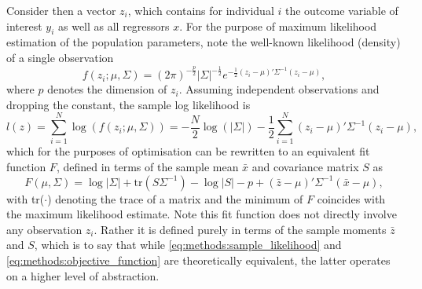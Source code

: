 Consider then a vector $z_i$, which contains for individual $i$ the outcome variable of interest $y_i$ as well as
all regressors $x$.
For the purpose of maximum likelihood estimation of the population parameters, note the well-known
likelihood (density) of a single observation
\begin{equation}
    f(z_i; \mu, \Sigma) = (2\pi)^{-\frac{p}{2}} |\Sigma|^{-\frac{1}{2}} e^{-\frac{1}{2}(z_i - \mu)' \Sigma^{-1}(z_i - \mu)},
\end{equation}
where $p$ denotes the dimension of $z_i$.
Assuming independent observations and dropping the constant, the sample log likelihood is
\begin{equation}
    \label{eq:methods:sample_likelihood}
    l(z) = \sum_{i=1}^N \log(f(z_i; \mu, \Sigma))
    = -\frac{N}{2} \log(|\Sigma|) -\frac{1}{2} \sum_{i=1}^N (z_i - \mu)' \Sigma^{-1} (z_i - \mu),
\end{equation}
which for the purposes of optimisation can be rewritten to an equivalent fit function $F$, defined in terms of
the sample mean $\bar{x}$ and covariance matrix $S$ \cite{preacher2016ml} as
\begin{equation}
    \label{eq:methods:objective_function}
    F(\mu, \Sigma) = \log|\Sigma| + \text{tr}(S \Sigma^{-1}) - \log|S| - p + (\bar{z} - \mu)' \Sigma^{-1} (\bar{x} - \mu),
\end{equation}
with tr($\cdot$) denoting the trace of a matrix and the minimum of $F$ coincides with the maximum likelihood estimate.
Note this fit function does not directly involve any observation $z_i$. Rather it is defined purely in terms of the
sample moments $\bar{z}$ and $S$, which is to say that while \cref{eq:methods:sample_likelihood} and
\cref{eq:methods:objective_function} are theoretically equivalent, the latter operates on a higher level of abstraction.


